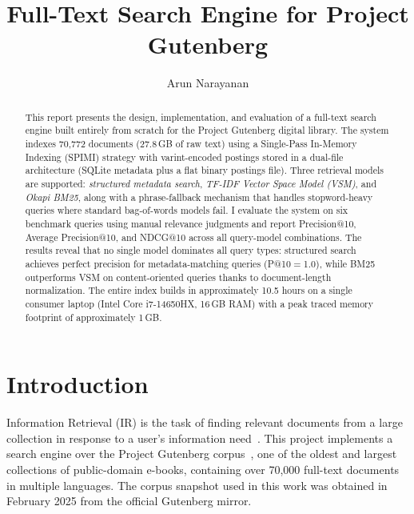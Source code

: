 \documentclass[sigconf,nonacm]{acmart}
\begin{document}
\title{Full-Text Search Engine for Project Gutenberg}

\author{Arun Narayanan}

\begin{abstract}
This report presents the design, implementation, and evaluation of a full-text
search engine built entirely from scratch for the Project Gutenberg digital
library.  The system indexes 70{,}772 documents (27.8\,GB of raw text) using a
Single-Pass In-Memory Indexing (SPIMI) strategy with varint-encoded postings
stored in a dual-file architecture (SQLite metadata plus a flat binary postings
file).  Three retrieval models are supported: \emph{structured metadata search},
\emph{TF-IDF Vector Space Model (VSM)}, and \emph{Okapi BM25}, along with a
phrase-fallback mechanism that handles stopword-heavy queries where standard
bag-of-words models fail.  I evaluate the system on six benchmark queries using
manual relevance judgments and report Precision@10, Average Precision@10, and
NDCG@10 across all query-model combinations.  The results reveal that no single
model dominates all query types: structured search achieves perfect precision
for metadata-matching queries (P@10$=$1.0), while BM25 outperforms VSM on
content-oriented queries thanks to document-length normalization.  The entire
index builds in approximately 10.5 hours on a single consumer laptop (Intel
Core i7-14650HX, 16\,GB RAM) with a peak traced memory footprint of approximately 1\,GB.
\end{abstract}


\maketitle

\section{Introduction}

Information Retrieval (IR) is the task of finding relevant documents from a
large collection in response to a user's information
need~\cite{manning2008introduction}.  This project implements a search engine
over the Project Gutenberg corpus~\cite{gutenberg2024}, one of the oldest and
largest collections of public-domain e-books, containing over 70{,}000 full-text
documents in multiple languages.  The corpus snapshot used in this work was
obtained in February 2025 from the official Gutenberg mirror.
\end{document}

